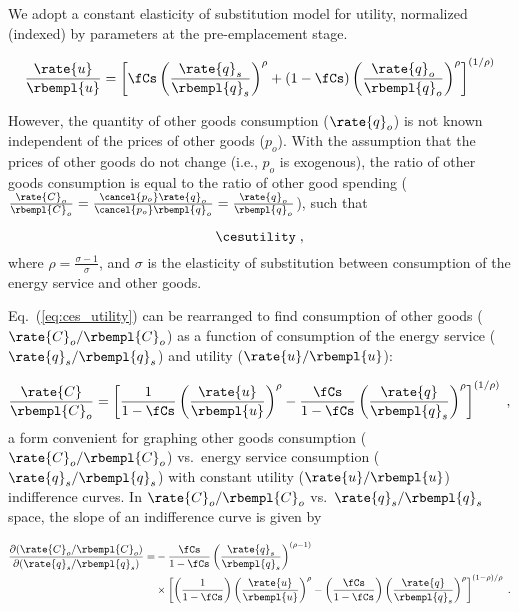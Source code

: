 
We adopt a constant elasticity of substitution model for utility,
normalized (indexed) by parameters at the pre-emplacement stage.

\begin{equation}
  \frac{\rate{u}}{\rbempl{u}} = 
  \left[ \fCs \left( \frac{\rate{q}_s}{\rbempl{q}_s} \right)^\rho 
        + (1-\fCs) \left( \frac{\rate{q}_o}{\rbempl{q}_o} \right)^\rho  \right]^{(1/\rho)}
\end{equation}

However, the quantity of other goods consumption ($\rate{q}_o$)
is not known independent of the prices of other goods ($p_o$).
With the assumption that the prices of other goods do not change
(i.e., $p_o$ is exogenous), 
the ratio of other goods consumption is equal to the ratio of other good spending
($\frac{\rate{C}_o}{\rbempl{C}_o} = \frac{\cancel{p_o} \rate{q}_o}{\cancel{p_o} \rbempl{q}_o} =
\frac{\rate{q}_o}{\rbempl{q}_o}$), such that

\begin{equation} \label{eq:ces_utility}
  \cesutility \; ,
\end{equation}
%
where $\rho = \frac{\sigma - 1}{\sigma}$, and 
$\sigma$ is the elasticity of substitution between
consumption of the energy service and other goods.

Eq.~(\ref{eq:ces_utility}) can be rearranged to find 
consumption of other goods ($\rate{C}_o/\rbempl{C}_o$)
as a function of consumption of the energy service 
($\rate{q}_s/\rbempl{q}_s$)
and utility ($\rate{u}/\rbempl{u}$):

\begin{equation}
  \frac{\rate{C}}{\rbempl{C}_o} = 
      \left[ \frac{1}{1 - \fCs} \left( \frac{\rate{u}}{\rbempl{u}} \right)^\rho 
            - \frac{\fCs}{1 - \fCs} \left( \frac{\rate{q}}{\rbempl{q}_s} \right)^\rho \right]^{(1/\rho)} \; ,
\end{equation}
%
a form convenient for graphing other goods consumption ($\rate{C}_o/\rbempl{C}_o$) vs.\ 
energy service consumption ($\rate{q}_s/\rbempl{q}_s$) 
with constant utility ($\rate{u}/\rbempl{u}$) indifference curves.
In $\rate{C}_o/\rbempl{C}_o$ vs.\ $\rate{q}_s/\rbempl{q}_s$ space, 
the slope of an indifference curve is given by 

\begin{align} \label{eq:slope_indifference_curve}
  \frac{\partial (\rate{C}_o/\rbempl{C}_o)}{\partial (\rate{q}_s/\rbempl{q}_s)} =&
        -\frac{\fCs}{1 - \fCs} \left( \frac{\rate{q}_s}{\rbempl{q}_s} \right)^{(\rho -1)} \\
        &\times \left[ \left( \frac{1}{1 - \fCs} \right) \left( \frac{\rate{u}}{\rbempl{u}} \right)^\rho
                - \left( \frac{\fCs}{1 - \fCs} \right) 
                          \left( \frac{\rate{q}}{\rbempl{q}_s} \right)^\rho \right]^{(1 - \rho)/\rho} \; .
\end{align}

